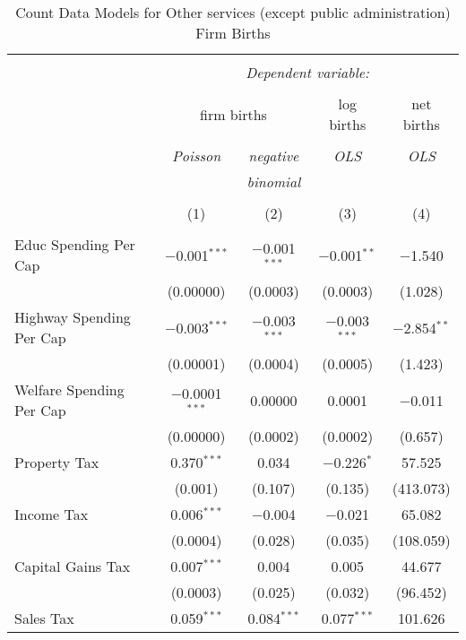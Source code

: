 
\begin{table}[!htbp] \centering 
  \caption{Count Data Models for Other services (except public administration) Firm Births} 
  \label{} 
\begin{tabular}{@{\extracolsep{5pt}}lcccc} 
\\[-1.8ex]\hline 
\hline \\[-1.8ex] 
 & \multicolumn{4}{c}{\textit{Dependent variable:}} \\ 
\cline{2-5} 
\\[-1.8ex] & \multicolumn{2}{c}{firm births} & log births & net births \\ 
\\[-1.8ex] & \textit{Poisson} & \textit{negative} & \textit{OLS} & \textit{OLS} \\ 
 & \textit{} & \textit{binomial} & \textit{} & \textit{} \\ 
\\[-1.8ex] & (1) & (2) & (3) & (4)\\ 
\hline \\[-1.8ex] 
 Educ Spending Per Cap & $-$0.001$^{***}$ & $-$0.001$^{***}$ & $-$0.001$^{**}$ & $-$1.540 \\ 
  & (0.00000) & (0.0003) & (0.0003) & (1.028) \\ 
  Highway Spending Per Cap  & $-$0.003$^{***}$ & $-$0.003$^{***}$ & $-$0.003$^{***}$ & $-$2.854$^{**}$ \\ 
  & (0.00001) & (0.0004) & (0.0005) & (1.423) \\ 
  Welfare Spending Per Cap  & $-$0.0001$^{***}$ & 0.00000 & 0.0001 & $-$0.011 \\ 
  & (0.00000) & (0.0002) & (0.0002) & (0.657) \\ 
  Property Tax & 0.370$^{***}$ & 0.034 & $-$0.226$^{*}$ & 57.525 \\ 
  & (0.001) & (0.107) & (0.135) & (413.073) \\ 
  Income Tax & 0.006$^{***}$ & $-$0.004 & $-$0.021 & 65.082 \\ 
  & (0.0004) & (0.028) & (0.035) & (108.059) \\ 
  Capital Gains Tax & 0.007$^{***}$ & 0.004 & 0.005 & 44.677 \\ 
  & (0.0003) & (0.025) & (0.032) & (96.452) \\ 
  Sales Tax & 0.059$^{***}$ & 0.084$^{***}$ & 0.077$^{***}$ & 101.626 \\ 

\end{tabular}
\end{table}

